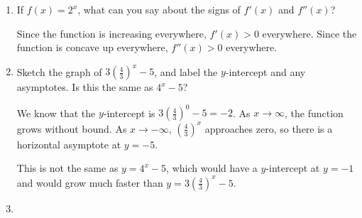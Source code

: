 \documentclass{article}
\begin{document}
\begin{enumerate}[resume, topsep=0pt]
\item 


  \begin{problem}[\nstretch{1}]
    If $f(x) = 2^x$, what can you say about the signs of $f'(x)$ and
    $f''(x)$?
  \end{problem}

  \begin{solution}
    Since the function is increasing everywhere, $f'(x)>0$ everywhere.
    Since the function is concave up everywhere, $f''(x) >0$
    everywhere.
  \end{solution}

\item 

  \begin{problem}[\stretch{2.5}]
    Sketch the graph of $3 \left( \frac{4}{3} \right)^x - 5$, and label the $y$-intercept and any asymptotes. Is this the same as $4^x - 5$?
  \end{problem}

  \begin{solution}
    We know that the $y$-intercept is $3(\frac{4}{3})^0-5=-2$. As $x\to\infty$,
    the function grows without bound. As $x\to-\infty$, $(\frac{4}{3})^x$ approaches
    zero, so there is a horizontal asymptote at $y=-5$.
    
    This is not the same as $y=4^x-5$, which would have a $y$-intercept at $y=-1$ and
    would grow much faster than $y=3(\frac{4}{3})^x -5$.
  \end{solution}

\item  \label{rules}


\end{enumerate}
\end{document}
